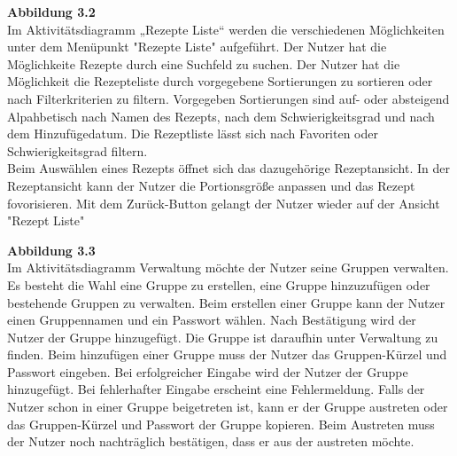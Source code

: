 \documentclass[parskip=full]{scrartcl}
\begin{document}
\textbf{Abbildung 3.2}\\
Im Aktivitätsdiagramm „Rezepte Liste“ werden die verschiedenen Möglichkeiten unter dem Menüpunkt "Rezepte Liste" aufgeführt.
Der Nutzer hat die Möglichkeite Rezepte durch eine Suchfeld zu suchen.
Der Nutzer hat die Möglichkeit die Rezepteliste durch vorgegebene Sortierungen zu sortieren oder nach Filterkriterien zu filtern.
Vorgegeben Sortierungen sind auf- oder absteigend Alpahbetisch nach Namen des Rezepts, nach dem Schwierigkeitsgrad und nach dem Hinzufügedatum.
Die Rezeptliste lässt sich nach Favoriten oder Schwierigkeitsgrad filtern.\\
Beim Auswählen eines Rezepts öffnet sich das dazugehörige Rezeptansicht.
In der Rezeptansicht kann der Nutzer die Portionsgröße anpassen und das Rezept fovorisieren.
Mit dem Zurück-Button gelangt der Nutzer wieder auf der Ansicht "Rezept Liste"

\textbf{Abbildung 3.3}\\
Im Aktivitätsdiagramm Verwaltung möchte der Nutzer seine Gruppen verwalten.
Es besteht die Wahl eine Gruppe zu erstellen, eine Gruppe hinzuzufügen oder bestehende Gruppen zu verwalten.
Beim erstellen einer Gruppe kann der Nutzer einen Gruppennamen und ein Passwort wählen.
Nach Bestätigung wird der Nutzer der Gruppe hinzugefügt.
Die Gruppe ist daraufhin unter Verwaltung zu finden.
Beim hinzufügen einer Gruppe muss der Nutzer das Gruppen-Kürzel und Passwort eingeben.
Bei erfolgreicher Eingabe wird der Nutzer der Gruppe hinzugefügt.
Bei fehlerhafter Eingabe erscheint eine Fehlermeldung.
Falls der Nutzer schon in einer Gruppe beigetreten ist, kann er der Gruppe austreten oder das Gruppen-Kürzel und Passwort der Gruppe kopieren.
Beim Austreten muss der Nutzer noch nachträglich bestätigen, dass er aus der austreten möchte.
\newpage
\end{document}
